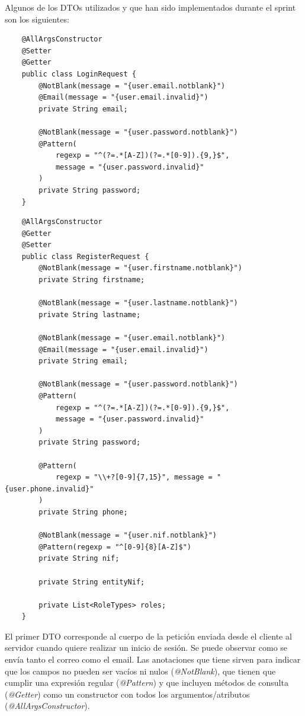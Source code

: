 \begin{itemize}
    Algunos de los DTOs utilizados y que han sido implementados durante el sprint son los siguientes:

    \begin{verbatim}
    @AllArgsConstructor
    @Setter
    @Getter
    public class LoginRequest {
        @NotBlank(message = "{user.email.notblank}")
        @Email(message = "{user.email.invalid}")
        private String email;

        @NotBlank(message = "{user.password.notblank}")
        @Pattern(
            regexp = "^(?=.*[A-Z])(?=.*[0-9]).{9,}$", 
            message = "{user.password.invalid}"
        )
        private String password;
    }
    \end{verbatim}

    \begin{verbatim}
    @AllArgsConstructor
    @Getter
    @Setter
    public class RegisterRequest {
        @NotBlank(message = "{user.firstname.notblank}")
        private String firstname;

        @NotBlank(message = "{user.lastname.notblank}")
        private String lastname;

        @NotBlank(message = "{user.email.notblank}")
        @Email(message = "{user.email.invalid}")
        private String email;

        @NotBlank(message = "{user.password.notblank}")
        @Pattern(
            regexp = "^(?=.*[A-Z])(?=.*[0-9]).{9,}$", 
            message = "{user.password.invalid}"
        )
        private String password;
        
        @Pattern(
            regexp = "\\+?[0-9]{7,15}", message = "{user.phone.invalid}"
        )
        private String phone;

        @NotBlank(message = "{user.nif.notblank}")
        @Pattern(regexp = "^[0-9]{8}[A-Z]$")
        private String nif;

        private String entityNif;

        private List<RoleTypes> roles;
    }
    \end{verbatim}

    El primer DTO corresponde al cuerpo de la petición enviada desde el cliente al servidor cuando quiere realizar un inicio de sesión. Se puede
    observar como se envía tanto el correo como el email. Las anotaciones que tiene sirven para indicar que los campos no pueden ser vacíos ni nulos
    (\textit{@NotBlank}), que tienen que cumplir una expresión regular (\textit{@Pattern}) y que incluyen métodos de consulta (\textit{@Getter}) como
    un constructor con todos los argumentos/atributos (\textit{@AllArgsConstructor}).
\end{itemize}

